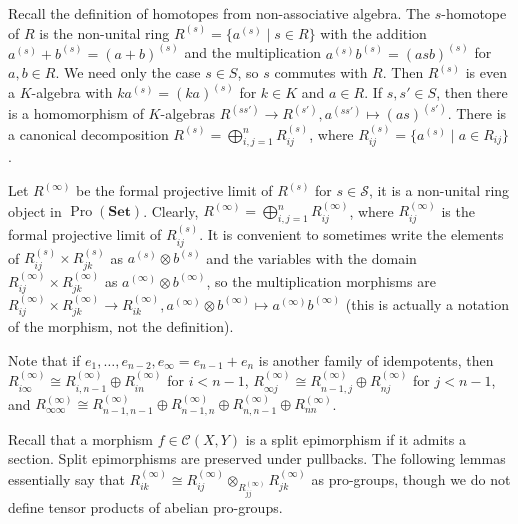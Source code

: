 \documentclass{article}
\newcommand{\rar}{\rightarrow}
\newcommand{\Set}{\mathbf{Set}}
\DeclareMathOperator{\Pro}{Pro}
\begin{document}
Recall the definition of homotopes from non-associative algebra. The \(s\)-homotope of \(R\) is the non-unital ring \(R^{(s)} = \{a^{(s)} \mid s \in R\}\) with the addition \(a^{(s)} + b^{(s)} = (a + b)^{(s)}\) and the multiplication \(a^{(s)} b^{(s)} = (asb)^{(s)}\) for \(a, b \in R\). We need only the case \(s \in S\), so \(s\) commutes with \(R\). Then \(R^{(s)}\) is even a \(K\)-algebra with \(ka^{(s)} = (ka)^{(s)}\) for \(k \in K\) and \(a \in R\). If \(s, s' \in S\), then there is a homomorphism of \(K\)-algebras \(R^{(ss')} \rar R^{(s')}, a^{(ss')} \mapsto (as)^{(s')}\). There is a canonical decomposition \(R^{(s)} = \bigoplus_{i, j = 1}^n R^{(s)}_{ij}\), where \(R^{(s)}_{ij} = \{a^{(s)} \mid a \in R_{ij}\}\).

Let \(R^{(\infty)}\) be the formal projective limit of \(R^{(s)}\) for \(s \in \mathcal S\), it is a non-unital ring object in \(\Pro(\Set)\). Clearly, \(R^{(\infty)} = \bigoplus_{i, j = 1}^n R^{(\infty)}_{ij}\), where \(R^{(\infty)}_{ij}\) is the formal projective limit of \(R^{(s)}_{ij}\). It is convenient to sometimes write the elements of \(R_{ij}^{(s)} \times R_{jk}^{(s)}\) as \(a^{(s)} \otimes b^{(s)}\) and the variables with the domain \(R_{ij}^{(\infty)} \times R_{jk}^{(\infty)}\) as \(a^{(\infty)} \otimes b^{(\infty)}\), so the multiplication morphisms are \(R_{ij}^{(\infty)} \times R_{jk}^{(\infty)} \rar R_{ik}^{(\infty)}, a^{(\infty)} \otimes b^{(\infty)} \mapsto a^{(\infty)} b^{(\infty)}\) (this is actually a notation of the morphism, not the definition).

Note that if \(e_1, \ldots, e_{n - 2}, e_\infty = e_{n - 1} + e_n\) is another family of idempotents, then \(R_{i\infty}^{(\infty)} \cong R_{i, n - 1}^{(\infty)} \oplus R_{in}^{(\infty)}\) for \(i < n - 1\), \(R_{\infty j}^{(\infty)} \cong R_{n - 1, j}^{(\infty)} \oplus R_{nj}^{(\infty)}\) for \(j < n - 1\), and \(R_{\infty\infty}^{(\infty)} \cong R_{n - 1, n - 1}^{(\infty)} \oplus R_{n - 1, n}^{(\infty)} \oplus R_{n, n - 1}^{(\infty)} \oplus R_{nn}^{(\infty)}\).

Recall that a morphism \(f \in \mathcal C(X, Y)\) is a split epimorphism if it admits a section. Split epimorphisms are preserved under pullbacks. The following lemmas essentially say that \(R_{ik}^{(\infty)} \cong R_{ij}^{(\infty)} \otimes_{R_{jj}^{(\infty)}} R_{jk}^{(\infty)}\) as pro-groups, though we do not define tensor products of abelian pro-groups.
\end{document}
